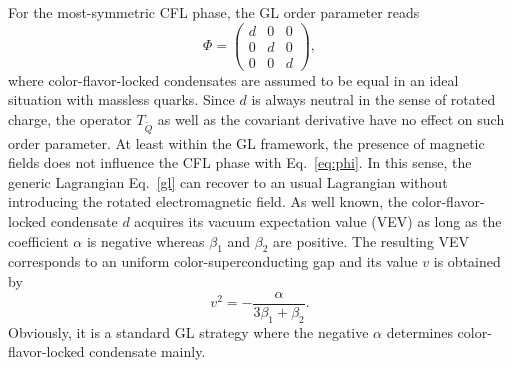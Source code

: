\documentclass[12pt]{article}
\begin{document}
For the most-symmetric CFL phase, the GL order parameter reads
\begin{equation}
  \label{eq:phi}
  \Phi =
  \begin{pmatrix}
    d & 0 & 0 \\
    0 & d & 0 \\
    0 & 0 & d
    \end{pmatrix},
\end{equation}
where color-flavor-locked condensates are assumed to be equal in an ideal situation with massless quarks.
Since $d$ is always neutral in the sense of rotated charge, the operator $T_{\widetilde{Q}}$ as well as
the covariant derivative have no effect on such order parameter.
At least within the GL framework, the presence of magnetic fields
does not influence the CFL phase with Eq.~\eqref{eq:phi}.
In this sense, the generic Lagrangian Eq.~\eqref{gl} can recover to an usual Lagrangian without
introducing the rotated electromagnetic field.
As well known, the color-flavor-locked condensate $d$ acquires its vacuum expectation value (VEV) as long as
the coefficient $\alpha$ is negative whereas $\beta_1$ and $\beta_2$ are positive.
The resulting VEV corresponds to an uniform color-superconducting gap and its value $v$ is obtained by
\begin{equation}
  \label{eq:dvaccum}
v^2 = -\frac{\alpha}{3\beta_1+\beta_2}.
\end{equation}
Obviously, it is a standard GL strategy where the negative $\alpha$ determines color-flavor-locked condensate mainly.
\end{document}

